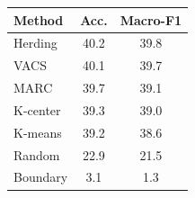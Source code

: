 \begin{tabular}{lcc}
\toprule
Method & Acc. & Macro-F1 \\
\midrule
Herding & 40.2 & 39.8 \\
VACS & 40.1 & 39.7 \\
MARC & 39.7 & 39.1 \\
K-center & 39.3 & 39.0 \\
K-means & 39.2 & 38.6 \\
Random & 22.9 & 21.5 \\
Boundary & 3.1 & 1.3 \\
\bottomrule
\end{tabular}
